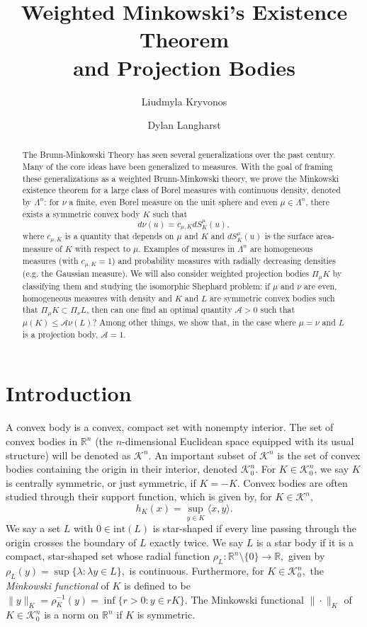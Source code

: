 \documentclass[11pt]{amsart}
\title[Weighted Minkowski's Existence Theorem]{Weighted Minkowski's Existence Theorem \\ and Projection Bodies}
\author{Liudmyla Kryvonos}
\author{Dylan Langharst}
\theoremstyle{definition}
\theoremstyle{remark}
\numberwithin{equation}{section}
\newcommand{\R}{\mathbb{R}}
\newcommand{\conbod}{\mathcal{K}^n}
\begin{document}
\begin{abstract}
The Brunn-Minkowski Theory has seen several generalizations over the past century. Many of the core ideas have been generalized to measures. With the goal of framing these generalizations as a weighted Brunn-Minkowski theory, we prove the Minkowski existence theorem for a large class of Borel measures with continuous density, denoted by $\Lambda^n$: for $\nu$ a finite, even Borel measure on the unit sphere and even $\mu\in\Lambda^n$, there exists a symmetric convex body $K$ such that
$$d\nu(u)=c_{\mu,K}dS^{\mu}_{K}(u),$$ 
where $c_{\mu,K}$ is a quantity that depends on $\mu$ and $K$ and $dS^{\mu}_{K}(u)$ is the surface area-measure of $K$ with respect to $\mu$. Examples of measures in $\Lambda^n$ are homogeneous measures (with $c_{\mu,K}=1$) and probability measures with radially decreasing densities (e.g. the Gaussian measure). We will also consider weighted projection bodies $\Pi_\mu K$ by classifying them and studying the isomorphic Shephard problem: if $\mu$ and $\nu$ are even, homogeneous measures with density and $K$ and $L$ are symmetric convex bodies such that
$\Pi_{\mu} K \subset \Pi_{\nu} L$, then can one find an optimal quantity $\mathcal{A}>0$ such that $\mu(K)\leq \mathcal{A}\nu(L)$? Among other things, we show that, in the case where $\mu=\nu$ and $L$ is a projection body, $\mathcal{A}=1$.
\end{abstract}

\maketitle

\section{Introduction}
A convex body is a convex, compact set with nonempty interior. The set of convex bodies in $\R^n$ (the $n$-dimensional Euclidean space equipped with its usual structure) will be denoted as $\conbod$.  An important subset of $\conbod$ is the set of convex bodies containing the origin in their interior, denoted $\conbod_0.$ For $K\in\conbod_0$, we say $K$ is centrally symmetric, or just symmetric, if $K=-K.$ Convex bodies are often studied through their support function, which is given by, for $K\in\conbod,$ $$h_K(x)=\sup_{y\in K}\langle x, y\rangle.$$ 
We say a set $L$ with $0 \in \text{int}(L)$ is star-shaped if every line passing through the origin crosses the boundary of $L$ exactly twice. We say $L$ is a star body %
if it is a compact, star-shaped set whose radial function $\rho_L:\R^n\setminus \{0\} \to \R,$ given by $\rho_L(y)=\sup\{\lambda:\lambda y\in L\},$ is continuous. Furthermore, for $K\in\conbod_0,$ the \textit{Minkowski functional} of $K$ is defined to be $\|y\|_K=\rho^{-1}_K(y)=\inf\{r>0:y\in rK\}.$ The Minkowski functional $\|\cdot\|_K$ of $K\in\conbod_0$ is a norm on $\R^n$ if $K$ is symmetric.
\end{document}
